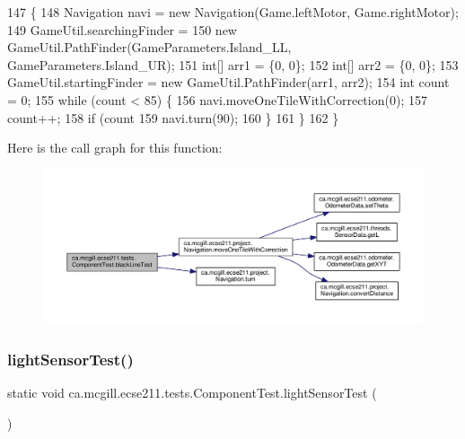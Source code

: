 \begin{DoxyCode}
147                                                                \{
148     Navigation navi = \textcolor{keyword}{new} Navigation(Game.leftMotor, Game.rightMotor);
149     GameUtil.searchingFinder =
150         \textcolor{keyword}{new} GameUtil.PathFinder(GameParameters.Island\_LL, GameParameters.Island\_UR);
151     \textcolor{keywordtype}{int}[] arr1 = \{0, 0\};
152     \textcolor{keywordtype}{int}[] arr2 = \{0, 0\};
153     GameUtil.startingFinder = \textcolor{keyword}{new} GameUtil.PathFinder(arr1, arr2);
154     \textcolor{keywordtype}{int} count = 0;
155     \textcolor{keywordflow}{while} (count < 85) \{
156       navi.moveOneTileWithCorrection(0);
157       count++;
158       \textcolor{keywordflow}{if} (count %
159         navi.turn(90);
160       \}
161     \}
162   \}
\end{DoxyCode}
Here is the call graph for this function\+:\nopagebreak
\begin{figure}[H]
\begin{center}
\leavevmode
\includegraphics[width=350pt]{enumca_1_1mcgill_1_1ecse211_1_1tests_1_1_component_test_a3f36cee9ca567c845377bec33554ba8b_cgraph}
\end{center}
\end{figure}
\mbox{\label{enumca_1_1mcgill_1_1ecse211_1_1tests_1_1_component_test_a3e8288f482b3806a0f3c4668951f3e36}} 
\subsubsection{\texorpdfstring{light\+Sensor\+Test()}{lightSensorTest()}}
{\footnotesize\ttfamily static void ca.\+mcgill.\+ecse211.\+tests.\+Component\+Test.\+light\+Sensor\+Test (\begin{DoxyParamCaption}{ }\end{DoxyParamCaption})\hspace{0.3cm}{\ttfamily [static]}}

